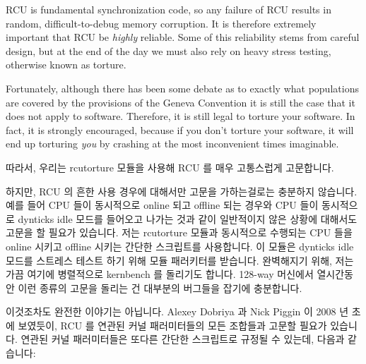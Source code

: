 RCU is fundamental synchronization code, so any failure of RCU
results in random, difficult-to-debug memory corruption.
It is therefore extremely important that RCU be \emph{highly} reliable.
Some of this reliability stems from careful design, but at the
end of the day we must also rely on heavy stress testing, otherwise
known as torture.

Fortunately, although there has been some debate as to exactly
what populations are covered by the provisions of the Geneva Convention
it is still the case that it does not apply to software.
Therefore, it is still legal to torture your software.
In fact, it is strongly encouraged, because if you don't torture your
software, it will end up torturing \emph{you} by crashing at the most
inconvenient times imaginable.
\fi

따라서, 우리는 rcutorture 모듈을 사용해 RCU 를 매우 고통스럽게 고문합니다.

하지만, RCU 의 흔한 사용 경우에 대해서만 고문을 가하는걸로는 충분하지 않습니다.
예를 들어 CPU 들이 동시적으로 online 되고 offline 되는 경우와 CPU 들이
동시적으로 dynticks idle 모드를 들어오고 나가는 것과 같이 일반적이지 않은
상황에 대해서도 고문을 할 필요가 있습니다.
저는 rcutorture 모듈과 동시적으로 수행되는 CPU 들을 online 시키고 offline
시키는 간단한 스크립트를 사용합니다.
이 모듈은 dynticks idle 모드를 스트레스 테스트 하기 위해 
모듈 패러키터를 받습니다.
완벽해지기 위해, 저는 가끔 여기에 병렬적으로 kernbench 를 돌리기도 합니다.
128-way 머신에서 열시간동안 이런 종류의 고문을 돌리는 건 대부분의 버그들을
잡기에 충분합니다.
\iffalse

Therefore, we torture RCU quite vigorously using the rcutorture module.

However, it is not sufficient to torture the common-case uses of RCU.
It is also necessary to torture it in unusual situations, for example,
when concurrently onlining and offlining CPUs and when CPUs are concurrently
entering and exiting dynticks idle mode.
I use a simple scripts to online and offline CPUs that runs concurently
with the rcutorture module.
This module is given the \co{test_no_idle_hz} module parameter in order
to stress-test dynticks idle mode.
Just to be fully paranoid, I sometimes run a kernbench workload in parallel
as well.
Ten hours of this sort of torture on a 128-way machine seems sufficient
to shake out most bugs.
\fi

이것조차도 완전한 이야기는 아닙니다.
Alexey Dobriya 과 Nick Piggin 이 2008 년 초에 보였듯이, RCU 를 연관된 커널
패러미터들의 모든 조합들과 고문할 필요가 있습니다.
연관된 커널 패러미터들은 또다른 간단한 스크립트로 규정될 수 있는데, 다음과
같습니다:
\iffalse

